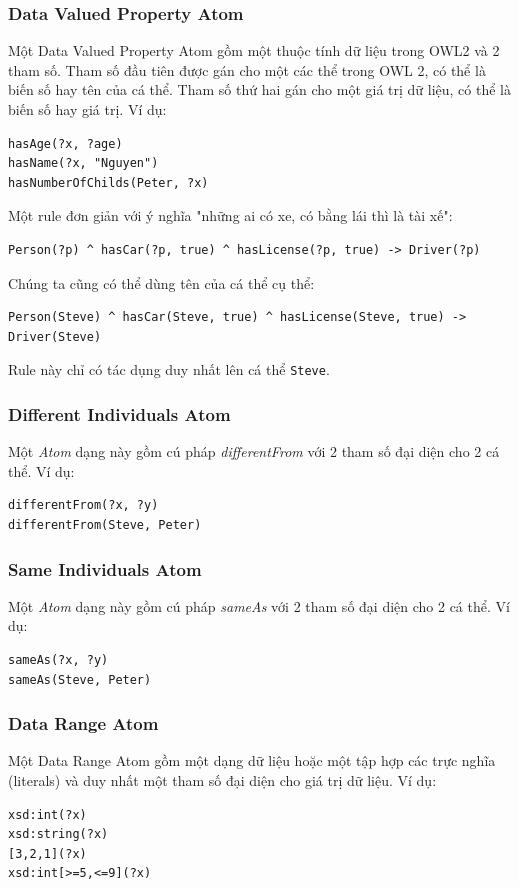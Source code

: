 \subsubsection{Data Valued Property Atom}
Một Data Valued Property Atom gồm một thuộc tính dữ liệu trong OWL2 và 2 tham số. Tham số đầu tiên được gán cho một các thể trong OWL 2, có thể là biến số hay tên của cá thể. Tham số thứ hai gán cho một giá trị dữ liệu, có thể là biến số hay giá trị. Ví dụ:
\begin{verbatim}
hasAge(?x, ?age)
hasName(?x, "Nguyen")
hasNumberOfChilds(Peter, ?x)
\end{verbatim}
Một rule đơn giản với ý nghĩa "những ai có xe, có bằng lái thì là tài xế":
\begin{verbatim}
Person(?p) ^ hasCar(?p, true) ^ hasLicense(?p, true) -> Driver(?p)
\end{verbatim}
Chúng ta cũng có thể dùng tên của cá thể cụ thể:
\begin{verbatim}
Person(Steve) ^ hasCar(Steve, true) ^ hasLicense(Steve, true) -> Driver(Steve)
\end{verbatim}
Rule này chỉ có tác dụng duy nhất lên cá thể \verb|Steve|.

\subsubsection{Different Individuals Atom}
Một \textit{Atom} dạng này gồm cú pháp \textit{differentFrom} với 2 tham số đại diện cho 2 cá thể. Ví dụ:
\begin{verbatim}
differentFrom(?x, ?y)
differentFrom(Steve, Peter)
\end{verbatim}

\subsubsection{Same Individuals Atom}
Một \textit{Atom} dạng này gồm cú pháp \textit{sameAs} với 2 tham số đại diện cho 2 cá thể. Ví dụ:
\begin{verbatim}
sameAs(?x, ?y)
sameAs(Steve, Peter)
\end{verbatim}

\subsubsection{Data Range Atom}
Một Data Range Atom gồm một dạng dữ liệu hoặc một tập hợp các trực nghĩa (literals) và duy nhất một tham số đại diện cho giá trị dữ liệu. Ví dụ:
\begin{verbatim}
xsd:int(?x)
xsd:string(?x)
[3,2,1](?x)
xsd:int[>=5,<=9](?x)
\end{verbatim}


